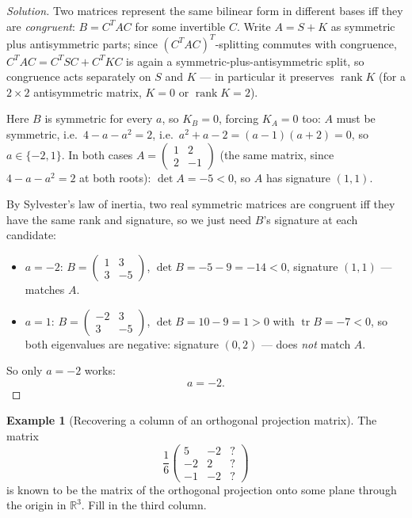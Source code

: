 \documentclass[11pt]{article}
\theoremstyle{definition}
\newtheorem{example}{Example}[section]
\newcommand{\R}{\mathbb{R}}
\newcommand{\rank}{\operatorname{rank}}
\newcommand{\trace}{\operatorname{tr}}
\begin{document}
\begin{proof}[Solution]
Two matrices represent the same bilinear form in different bases iff they are \emph{congruent}: $B=C^TAC$ for some invertible $C$. Write $A=S+K$ as symmetric plus antisymmetric parts; since $(C^TAC)^T$-splitting commutes with congruence, $C^TAC=C^TSC+C^TKC$ is again a symmetric-plus-antisymmetric split, so congruence acts separately on $S$ and $K$ — in particular it preserves $\rank K$ (for a $2\times2$ antisymmetric matrix, $K=0$ or $\rank K=2$).

Here $B$ is symmetric for every $a$, so $K_B=0$, forcing $K_A=0$ too: $A$ must be symmetric, i.e.\ $4-a-a^2=2$, i.e.\ $a^2+a-2=(a-1)(a+2)=0$, so $a\in\{-2,1\}$. In both cases $A=\begin{pmatrix}1&2\\2&-1\end{pmatrix}$ (the same matrix, since $4-a-a^2=2$ at both roots): $\det A=-5<0$, so $A$ has signature $(1,1)$.

By Sylvester's law of inertia, two real symmetric matrices are congruent iff they have the same rank and signature, so we just need $B$'s signature at each candidate:
\begin{itemize}
\item $a=-2$: $B=\begin{pmatrix}1&3\\3&-5\end{pmatrix}$, $\det B=-5-9=-14<0$, signature $(1,1)$ — matches $A$.
\item $a=1$: $B=\begin{pmatrix}-2&3\\3&-5\end{pmatrix}$, $\det B=10-9=1>0$ with $\trace B=-7<0$, so both eigenvalues are negative: signature $(0,2)$ — does \emph{not} match $A$.
\end{itemize}
So only $a=-2$ works:
\[
\boxed{a=-2}.
\]
\end{proof}

\begin{example}[Recovering a column of an orthogonal projection matrix]
The matrix
\[
\frac16\begin{pmatrix}5&-2&{?}\\-2&2&{?}\\-1&-2&{?}\end{pmatrix}
\]
is known to be the matrix of the orthogonal projection onto some plane through the origin in $\R^3$. Fill in the third column.
\end{example}
\end{document}

